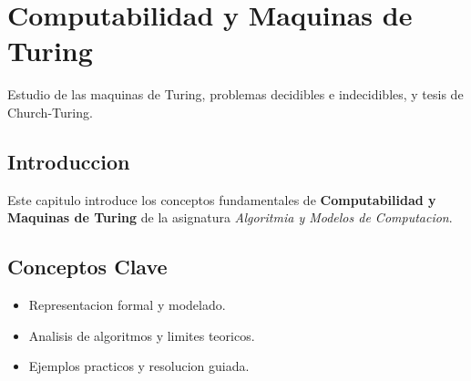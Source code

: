 \chapter{Computabilidad y Maquinas de Turing}
\label{ch:computabilidad}

Estudio de las maquinas de Turing, problemas decidibles e indecidibles, y tesis de Church-Turing.

\section{Introduccion}
Este capitulo introduce los conceptos fundamentales de \textbf{Computabilidad y Maquinas de Turing} de la asignatura \textit{Algoritmia y Modelos de Computacion}.

\section{Conceptos Clave}
\begin{itemize}
    \item Representacion formal y modelado.
    \item Analisis de algoritmos y limites teoricos.
    \item Ejemplos practicos y resolucion guiada.
\end{itemize}
